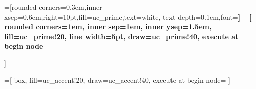 



\newcommand{\BlueBullets}{
  \renewcommand{\labelitemi}{\textcolor{uc_prime}{$\bullet$}}
  \renewcommand{\labelitemii}{\textcolor{uc_prime}{$\blacktriangleright$}}
}


=[rounded corners=0.3em,inner xsep=0.6em,right=10pt,fill=uc_prime,text=white, text depth=0.1em,font=\bfseries]
=[
  rounded corners=1em,
  inner sep=1em,
  inner ysep=1.5em,
  fill=uc_prime!20,
  line width=5pt,
  draw=uc_prime!40,
  execute at begin node=\BlueBullets
]

=[
  box,
  fill=uc_accent!20,
  draw=uc_accent!40,
  execute at begin node=\BrownBullets
]

% 
% 
\newcommand{\PBlock}[4]{
\begin{tikzpicture}
\node[box] (#1) {\begin{minipage}{\columnwidth-2em}#4\end{minipage}};
\node[heading] at (#1.north west) {#3};
\end{tikzpicture}
}

\newcommand{\Block}[2]{
  \PBlock{some-label}{}{#1}{#2}
}

\renewcommand{\section}[2]{} %
